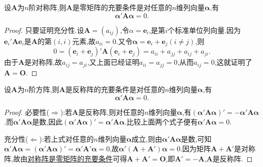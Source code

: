 \documentclass[../../main.tex]{subfiles}%
\begin{document}
\begin{proposition}[对称阵是零矩阵的充要条件]\label{proposition:对称阵是零矩阵的充要条件}
设\(\boldsymbol{A}\)为\(n\)阶对称阵,则\(\boldsymbol{A}\)是零矩阵的充要条件是对任意的\(n\)维列向量\(\boldsymbol{\alpha}\),有
\[
\boldsymbol{\alpha'} \boldsymbol{A} \boldsymbol{\alpha} = 0.
\]
\end{proposition}
\begin{proof}

只要证明充分性.设\(\boldsymbol{A}=(a_{ij})\),令\(\alpha = \boldsymbol{e}_{i}\),是第\(i\)个标准单位列向量.因为\(\boldsymbol{e}_{i}'\boldsymbol{A}\boldsymbol{e}_{i}\)是\(\boldsymbol{A}\)的第\((i, i)\)元素,故\(a_{ii}=0\).又令\(\boldsymbol{\alpha}=\boldsymbol{e}_{i}+\boldsymbol{e}_{j}(i \neq j)\),则
\[
0 = (\boldsymbol{e}_{i}+\boldsymbol{e}_{j})'\boldsymbol{A}(\boldsymbol{e}_{i}+\boldsymbol{e}_{j})=a_{ii}+a_{jj}+a_{ij}+a_{ji}.
\]
由于\(\boldsymbol{A}\)是对称阵,故\(a_{ij}=a_{ji}\),又上面已经证明\(a_{ii}=a_{jj}=0\),从而\(a_{ij}=0\),这就证明了\(\boldsymbol{A} = \boldsymbol{O}\).

\end{proof}

\begin{proposition}[反对称阵的充要条件]\label{proposition:反对称阵的刻画}
设\(\boldsymbol{A}\)为\(n\)阶方阵,则\(\boldsymbol{A}\)是反称阵的充要条件是对任意的\(n\)维列向量\(\boldsymbol{\alpha}\),有
\[
\boldsymbol{\alpha'} \boldsymbol{A} \boldsymbol{\alpha} = 0.
\]
\end{proposition}
\begin{proof}

必要性($\Rightarrow $):若\(\boldsymbol{A}\)是反称阵,则对任意的\(n\)维列向量\(\boldsymbol{\alpha}\),有\((\boldsymbol{\alpha' A \alpha})' = - \boldsymbol{\alpha' A \alpha}\).而\(\boldsymbol{\alpha' A \alpha}\)是数,因此\((\boldsymbol{\alpha' A \alpha})' = \boldsymbol{\alpha' A \alpha}\).比较上面两个式子便有\(\boldsymbol{\alpha' A \alpha} = 0\).

充分性($\Leftarrow $):若上式对任意的\(n\)维列向量\(\boldsymbol{\alpha}\)成立,则由\(\boldsymbol{\alpha' A \alpha}\)是数,可知$\boldsymbol{\alpha }'\boldsymbol{A\alpha }=\left( \boldsymbol{\alpha }'\boldsymbol{A\alpha } \right) '=\boldsymbol{\alpha }'\boldsymbol{A}'\boldsymbol{\alpha }=0$,故\(\boldsymbol{\alpha'}(\boldsymbol{A} + \boldsymbol{A'})\boldsymbol{\alpha} = 0\).因为矩阵\(\boldsymbol{A} + \boldsymbol{A'}\)是对称阵,故由\hyperref[proposition:对称阵是零矩阵的充要条件]{对称阵是零矩阵的充要条件}可得\(\boldsymbol{A} + \boldsymbol{A'} = \boldsymbol{O}\),即\(\boldsymbol{A'} = - \boldsymbol{A}\),\(\boldsymbol{A}\)是反称阵.

\end{proof}
\end{document}
